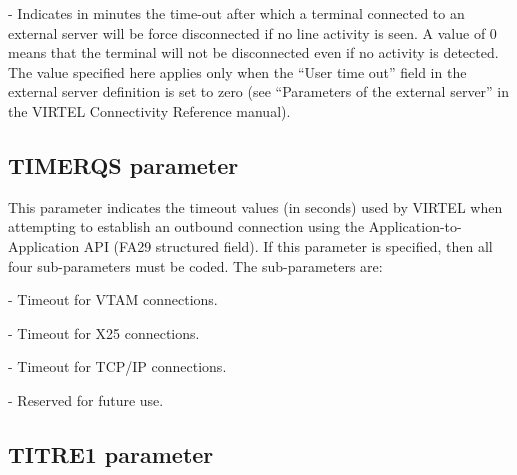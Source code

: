 \documentclass[letterpaper,10pt,english]{sphinxmanual}
\begin{document}
 - Indicates in minutes the time-out after which a terminal connected to an external server will be force disconnected if no line activity is seen. A value of 0 means that the terminal will not be disconnected even if no activity is detected. The value specified here applies only when the “User time out” field in the external server definition is set to zero (see “Parameters of the external server” in the VIRTEL Connectivity Reference manual).

\ignorespaces 

\subsection{TIMERQS parameter}
\label{\detokenize{Installation_Guide:timerqs-parameter}}\label{\detokenize{Installation_Guide:index-124}}
\begin{sphinxVerbatim}[commandchars=\\\{\}]
 
\end{sphinxVerbatim}

This parameter indicates the timeout values (in seconds) used by VIRTEL when attempting to establish an outbound connection using the Application-to-Application API (FA29 structured field). If this parameter is specified, then all four sub-parameters must be coded. The sub-parameters are:

 - Timeout for VTAM connections.

 - Timeout for X25 connections.

 - Timeout for TCP/IP connections.

 - Reserved for future use.

\ignorespaces 

\subsection{TITRE1 parameter}
\label{\detokenize{Installation_Guide:titre1-parameter}}\label{\detokenize{Installation_Guide:index-125}}
\begin{sphinxVerbatim}[commandchars=\\\{\}]
 
\end{sphinxVerbatim}
\end{document}

